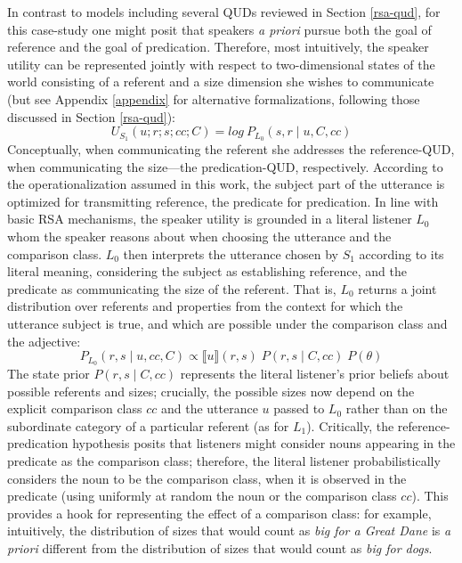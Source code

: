 In contrast to models including several QUDs reviewed in Section \ref{rsa-qud}, for this case-study one might posit that speakers \emph{a priori} pursue both the goal of reference and the goal of predication. Therefore, most intuitively, the speaker utility can be represented jointly with respect to two-dimensional states of the world consisting of a referent and a size dimension she wishes to communicate (but see Appendix \ref{appendix} for alternative formalizations, following those discussed in Section \ref{rsa-qud}): 
\begin{equation}
\label{model1}
U_{S_1} (u; r; s; cc; C) = log \: P_{L_0} (s, r \mid u, C, cc) 
\end{equation}
Conceptually, when communicating the referent she addresses the reference-QUD, when communicating the size---the predication-QUD, respectively. According to the operationalization assumed in this work, the subject part of the utterance is optimized for transmitting reference, the predicate for predication.
In line with basic RSA mechanisms, the speaker utility is grounded in a literal listener $L_0$ whom the speaker reasons about when choosing the utterance and the comparison class. 
$L_0$ then interprets the utterance chosen by $S_1$ according to its literal meaning, considering the subject as establishing reference, and the predicate as communicating the size of the referent. 
That is, $L_0$ returns a joint distribution over referents and properties from the context for which the utterance subject is true, and which are possible under the comparison class and the adjective: %
\begin{equation}
P_{L_0} (r, s \mid u, cc, C) \propto \llbracket u \rrbracket (r, s)  \;  P(r, s \mid C, cc) \; P(\theta)
\end{equation}
The state prior $P(r, s \mid C, cc)$ represents the literal listener's prior beliefs about possible referents and sizes; crucially, the possible sizes now depend on the explicit comparison class $cc$ and the utterance $u$ passed to $L_0$ rather than on the subordinate category of a particular referent (as for $L_1$). Critically, the reference-predication hypothesis posits that listeners might consider nouns appearing in the predicate as the comparison class; therefore, the literal listener probabilistically considers the noun to be the comparison class, when it is observed in the predicate (using uniformly at random the noun or the comparison class $cc$). This provides a hook for representing the effect of a comparison class: for example, intuitively, the distribution of sizes that would count as \emph{big for a Great Dane} is \emph{a priori} different from the distribution of sizes that would count as \emph{big for dogs}. 
